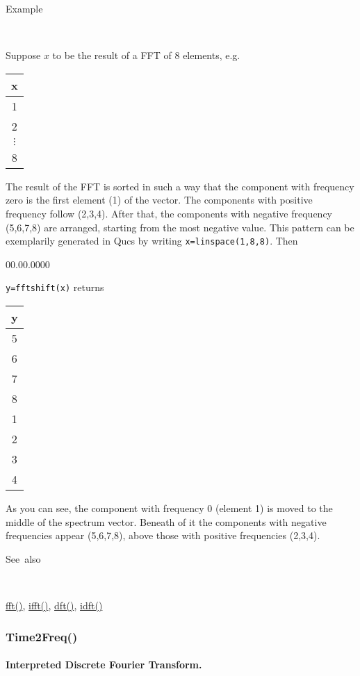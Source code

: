 \begin{description}
\item [Example]~
\end{description}
Suppose $x$ to be the result of a FFT of 8 elements, e.g.\begin{tabular}{|c|}
\hline 
x\tabularnewline
\hline
\hline 
1\tabularnewline
\hline 
2\tabularnewline
\hline 
$\vdots$\tabularnewline
\hline 
8\tabularnewline
\hline
\end{tabular}

The result of the FFT is sorted in such a way that the component with frequency zero is the first element (1) of the vector.
The components with positive frequency follow (2,3,4).
After that, the components with negative frequency (5,6,7,8) are arranged, starting from the most negative value.
This pattern can be exemplarily generated in Qucs by writing \texttt{x=linspace(1,8,8)}. Then

\begin{lyxlist}{00.00.0000}
\item [\texttt{y=fftshift(x)}]returns \begin{tabular}{|c|}
\hline 
y\tabularnewline
\hline
\hline 
5\tabularnewline
\hline 
6\tabularnewline
\hline 
7\tabularnewline
\hline
8\tabularnewline
\hline
1\tabularnewline
\hline
2\tabularnewline
\hline
3\tabularnewline
\hline
4\tabularnewline
\hline
\end{tabular}
\end{lyxlist}
As you can see, the component with frequency 0 (element 1) is moved to the middle of the spectrum vector.
Beneath of it the components with negative frequencies appear (5,6,7,8), above those with positive frequencies (2,3,4).

\begin{description}
\item [See~also]~
\end{description}
\textcolor{blue}{\hyperlink{fft}{fft()}}\textcolor{black}{,}
\textcolor{blue}{\hyperlink{ifft}{ifft()}}\textcolor{black}{,} \textcolor{blue}{\hyperlink{dft}{dft()}}\textcolor{black}{,}
\textcolor{blue}{\hyperlink{idft}{idft()}}


\newpage
\subsubsection*{\hypertarget{Time2Freq}{}{\Large Time2Freq()}}


\paragraph{\label{par:Interpreted-Discrete-Fourier-Transform}Interpreted Discrete Fourier Transform.}

